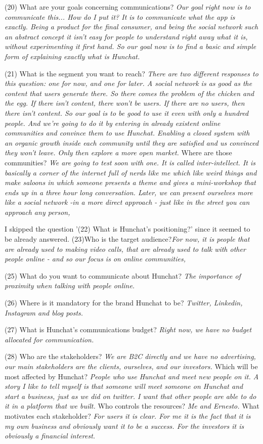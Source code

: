 \documentclass[11pt]{article}
\begin{document}
(20) What are your goals concerning communications? \textit{Our goal right now is to communicate this... How do I put it? It is to communicate what the app is exactly. Being a product for the final consumer, and being the social network such an abstract concept it isn't easy for people to understand right away what it is, without experimenting it first hand. So our goal now is to find a basic and simple form of explaining exactly what is Hunchat.}

(21) What is the segment you want to reach? \textit{There are two different responses to this question: one for now, and one for later. A social network is as good as the content that users generate there. So there comes the problem of the chicken and the egg. If there isn't content, there won't be users. If there are no users, then there isn't content. So our goal is to be good to use it even with only a hundred people. And we're going to do it by entering in already existent online communities and convince them to use Hunchat. Enabling a closed system with an organic growth inside each community until they are satisfied and us convinced they won't leave. Only then explore a more open market.} Where are those communities? \textit{We are going to test soon with one. It is called inter-intellect. It is basically a corner of the internet full of nerds like me which like weird things and make saloons in which someone presents a theme and gives a mini-workshop that ends up in a three hour long conversation. Later, we can present ourselves more like a social network -in a more direct approach - just like in the street you can approach any person,}

I skipped the question '(22) What is Hunchat’s positioning?' since it seemed to be already answered. (23)Who is the target audience?\textit{For now, it is people that are already used to making video calls, that are already used to talk with other people online - and so our focus is on online communities,}

(25) What do you want to communicate about Hunchat? \textit{The importance of proximity when talking with people online.}

(26) Where is it mandatory for the brand Hunchat to be? \textit{Twitter, Linkedin, Instagram and blog posts.}

(27) What is Hunchat’s communications budget? \textit{Right now, we have no budget allocated for communication.}

(28) Who are the stakeholders? \textit{We are B2C directly and we have no advertising, our main stakeholders are the clients, ourselves, and our investors.}  Which will be most affected by Hunchat? \textit{People who use Hunchat and meet new people on it. A story I like to tell myself is that someone will meet someone on Hunchat and start a business, just as we did on twitter. I want that other people are able to do it in a platform that we built. } Who controls the resources? \textit{Me and Ernesto.} What motivates each stakeholder? \textit{For users it is clear. For me it is the fact that it is my own business and obviously want it to be a success. For the investors it is obviously a financial interest.}
\end{document}
